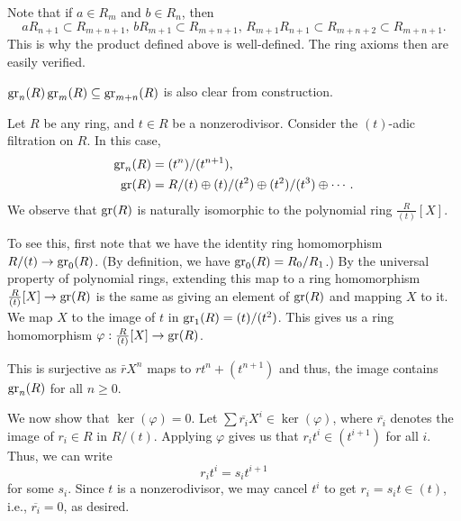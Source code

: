 \begin{rem}
	Note that if $a \in R_{m}$ and $b \in R_{n}$, then
	\begin{equation*} 
		a R_{n + 1} \subset R_{m + n + 1},\, b R_{m + 1} \subset R_{m + n + 1},\, R_{m + 1} R_{n + 1} \subset R_{m + n + 2} \subset R_{m + n + 1}.
	\end{equation*}
	This is why the product defined above is well-defined. The ring axioms then are easily verified.

	$\operatorname{gr}_{n}(R) \operatorname{gr}_{m}(R) \subseteq \operatorname{gr}_{m + n}(R)$ is also clear from construction.
\end{rem}

\begin{ex}
	Let $R$ be any ring, and $t \in R$ be a nonzerodivisor. Consider the $(t)$-adic filtration on $R$. In this case,
	\begin{align*} 
		\operatorname{gr}_{n}(R) &= (t^{n})/(t^{n + 1}), \\
		\operatorname{gr}(R) &= R/(t) \oplus (t)/(t^{2}) \oplus (t^{2})/(t^{3}) \oplus \cdots.
	\end{align*} 
	We observe that $\operatorname{gr}(R)$ is naturally isomorphic to the polynomial ring $\frac{R}{(t)}[X]$.

	To see this, first note that we have the identity ring homomorphism $R/(t) \to \operatorname{gr}_{0}(R)$. (By definition, we have $\operatorname{gr}_{0}(R) = R_{0}/R_{1}$.) \newline
	By the universal property of polynomial rings, extending this map to a ring homomorphism $\frac{R}{(t)}[X] \to \operatorname{gr}(R)$ is the same as giving an element of $\operatorname{gr}(R)$ and mapping $X$ to it. We map $X$ to the image of $t$ in $\operatorname{gr}_{1}(R) = (t)/(t^{2})$. This gives us a ring homomorphism $\varphi : \frac{R}{(t)}[X] \to \operatorname{gr}(R)$.

	This is surjective as $\bar{r} X^{n}$ maps to $r t^{n} + (t^{n + 1})$ and thus, the image contains $\operatorname{gr}_{n}(R)$ for all $n \ge 0$. 

	We now show that $\ker(\varphi) = 0$. Let $\sum \overline{r_{i}} X^{i} \in \ker(\varphi)$, where $\overline{r_{i}}$ denotes the image of $r_{i} \in R$ in $R/(t)$. \newline
	Applying $\varphi$ gives us that $r_{i} t^{i} \in (t^{i + 1})$ for all $i$. Thus, we can write
	\begin{equation*} 
		r_{i} t^{i} = s_{i} t^{i + 1}
	\end{equation*}
	for some $s_{i}$. Since $t$ is a nonzerodivisor, we may cancel $t^{i}$ to get $r_{i} = s_{i} t \in (t)$, i.e., $\overline{r_{i}} = 0$, as desired.
\end{ex}

